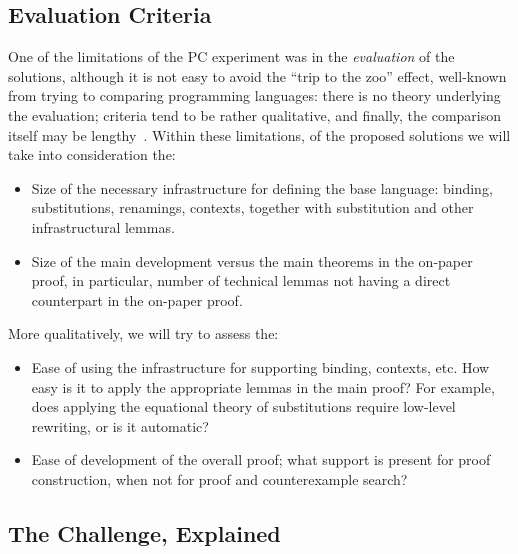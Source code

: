 \subsection{Evaluation Criteria}
\label{ssec:ev}
One of the limitations of the PC experiment was in the
\emph{evaluation} of the solutions, although it is not easy to avoid
the ``trip to the zoo'' effect, well-known from trying to comparing programming
languages: there is no theory underlying the evaluation; criteria
tend to be rather qualitative, and finally, the comparison itself may
be lengthy~\citep{companion}. Within these limitations, of the
proposed solutions we will take into consideration the:
\begin{itemize}
\item  Size of the necessary infrastructure for defining the base language:
    binding, substitutions, renamings, contexts, together with
    substitution and other infrastructural lemmas.
  \item Size of the main development versus the main theorems in the
    on-paper proof, in particular, number of technical lemmas not
    having a direct counterpart in the on-paper proof.
\end{itemize}
More qualitatively, we will try to assess the:
\begin{itemize}
\item Ease of using the infrastructure for supporting binding,
  contexts, etc. How easy is it to apply the appropriate lemmas in the
  main proof? For example, does applying the equational theory of
  substitutions require low-level rewriting, or is it automatic?
\item Ease of development of the overall proof; what support is
  present for proof construction, when not for proof and counterexample
  search?
\end{itemize}
\subsection{The Challenge, Explained}
\label{ssec:expl}






